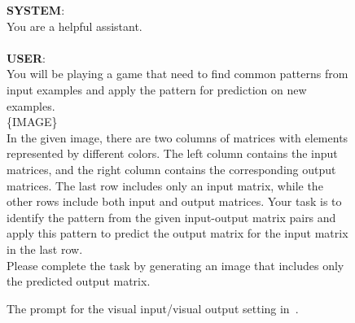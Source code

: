 \begin{figure*}
  \begin{tcolorbox}
  \textbf{SYSTEM}:\\
  You are a helpful assistant.\\\\
  \textbf{USER}: \\
        You will be playing a game that need to find common patterns from input examples and apply the pattern for prediction on new examples.\\

\{IMAGE\} \\

In the given image, there are two columns of matrices with elements represented by different colors. The left column contains the input matrices, and the right column contains the corresponding output matrices. The last row includes only an input matrix, while the other rows include both input and output matrices. Your task is to identify the pattern from the given input-output matrix pairs and apply this pattern to predict the output matrix for the input matrix in the last row. \\

Please complete the task by generating an image that includes only the predicted output matrix.

    \end{tcolorbox}
    \caption{The prompt for the visual input/visual output setting in~.}
    \label{fig:visual prompt}
\end{figure*}


